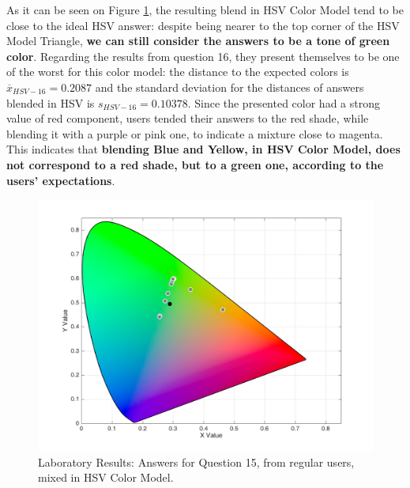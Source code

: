 \begin{enumerate}
  As it can be seen on Figure \ref{fig:labhsvregular_15}, the resulting blend in HSV Color Model tend to be close to the ideal HSV answer: despite being nearer to the top corner of the HSV Model Triangle, \textbf{we can still
  consider the answers to be a tone of green color}. Regarding the results from question 16, they present themselves to be one of the worst for this color model: the distance to the expected colors is $\overline{x}_{HSV-16} = 0.2087$
  and the standard deviation for the distances of answers blended in HSV is $s_{HSV-16} = 0.10378$. Since the presented color had a strong value of red component, users tended their answers to the red shade, while blending
  it with a purple or pink one, to indicate a mixture close to magenta. This indicates that \textbf{blending Blue and Yellow, in HSV Color Model, does not correspond to a red shade, but to a green one, according to
  the users' expectations}.
  \begin{figure}[!htbp]
    \centering
    \begin{minipage}{0.48\textwidth}
      \centering
      \includegraphics[width=\textwidth]{images/results/15_lab_HSVresponses.png}
      \caption[Laboratory Results: Answers for Question 15, from regular users, mixed in HSV Color Model.]{Laboratory Results: Answers for Question 15, from regular users, mixed in HSV Color Model.}
      \label{fig:labhsvregular_15}
    \end{minipage}\hfill
    \begin{minipage}{0.48\textwidth}
      \centering

\end{minipage}
\end{figure}
\end{enumerate}
